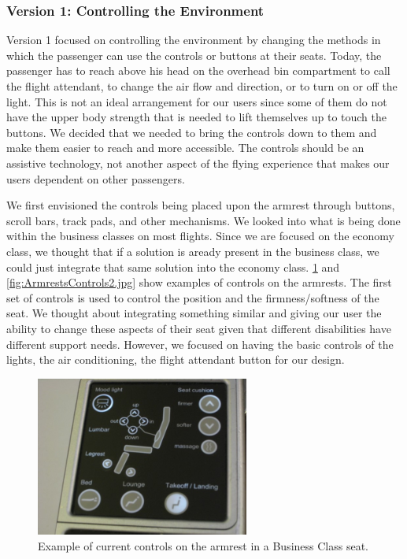 \subsubsection*{Version 1: Controlling the Environment} 
Version 1 focused on controlling the environment by changing the methods in which the passenger can use the controls or buttons at their seats.  Today, the passenger has to reach above his head on the overhead bin compartment to call the flight attendant, to change the air flow and direction, or to turn on or off the light.  This is not an ideal arrangement for our users since some of them do not have the upper body strength that is needed to lift themselves up to touch the buttons.  We decided that we needed to bring the controls down to them and make them easier to reach and more accessible.  The controls should be an assistive technology, not another aspect of the flying experience that makes our users dependent on other passengers.   

We first envisioned the controls being placed upon the armrest through buttons, scroll bars, track pads, and other mechanisms. We looked into what is being done within the business classes on most flights.  Since we are focused on the economy class, we thought that if a solution is aready present in the business class, we could just integrate that same solution into the economy class. \ref{fig:ArmrestsControls1.jpg} and \ref{fig:ArmrestsControls2.jpg} show examples of controls on the armrests.  The first set of controls is used to control the position and the firmness/softness of the seat.  We thought about integrating  something similar and giving our user the ability to change these aspects of their seat given that different disabilities have different support needs. However, we focused on having the basic controls of the lights, the air conditioning, the flight attendant button for our design. 

\begin{figure}[h]
  \centering
     \includegraphics[width=7cm]{images/ArmrestControls1.jpg}
   \caption{Example of current controls on the armrest in a Business Class seat. \cite{armrest_controls1}}
  \label{fig:ArmrestsControls1.jpg}
\end{figure}

